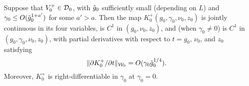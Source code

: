 \begin{prop}
\label{prop:Ksmooth}
Suppose that $V_0^+ \in \mathcal{D}_0$, with $\tilde{g}_0$ sufficiently small
(depending on $L$) and
$\gamma_0 \le O(\tilde{g}_0^{1+a'})$ for some $a' >a$.
Then the map $K^+_0(g_0, \gamma_0, \nu_0, z_0)$ is jointly continuous
in its four variables, is $C^1$ in $(g_0, \nu_0, z_0)$,
and (when $\gamma_0 \ne 0$) is $C^1$ in $(g_0, \gamma_0, \nu_0, z_0)$,
with partial derivatives with respect to $t = g_0$, $\nu_0$, and $z_0$ satisfying
\begin{equation}
\label{e:ddpK}
\|\partial K^+_0 / \partial t\|_{\mathcal{W}_0} = O(\gamma_0 \tilde{g}_0^{1/4}).
\end{equation}
Moreover, $K^+_0$ is %
right-differentiable in $\gamma_0$ at $\gamma_0 = 0$.
\end{prop}

